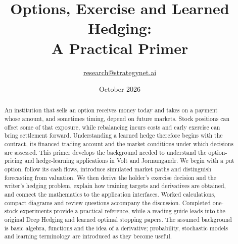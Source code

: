 \documentclass[8pt]{strategynet-journal}
\title{Options, Exercise and Learned Hedging:\\A Practical Primer}
\author{\href{mailto:research@strategynet.ai}{research@strategynet.ai}}
\date{October 2026}
\begin{document}
\maketitle
\begin{abstract}
\normalsize An institution that sells an option receives money today and takes on a payment whose amount, and sometimes timing, depend on future markets. Stock positions can offset some of that exposure, while rebalancing incurs costs and early exercise can bring settlement forward. Understanding a learned hedge therefore begins with the contract, its financed trading account and the market conditions under which decisions are assessed. This primer develops the background needed to understand the option-pricing and hedge-learning applications in Volt and Jormungandr. We begin with a put option, follow its cash flows, introduce simulated market paths and distinguish forecasting from valuation. We then derive the holder's exercise decision and the writer's hedging problem, explain how training targets and derivatives are obtained, and connect the mathematics to the application interfaces. Worked calculations, compact diagrams and review questions accompany the discussion. Completed one-stock experiments provide a practical reference, while a reading guide leads into the original Deep Hedging and learned optimal stopping papers. The assumed background is basic algebra, functions and the idea of a derivative; probability, stochastic models and learning terminology are introduced as they become useful.
\end{abstract}
\SNtwocolumntableofcontents
\end{document}
